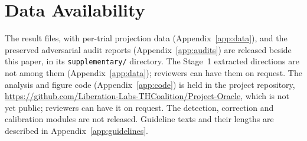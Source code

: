 \documentclass[11pt,letterpaper]{article}
\begin{document}
\section*{Data Availability}

The result files, with per-trial projection data (Appendix~\ref{app:data}), and the preserved
adversarial audit reports (Appendix~\ref{app:audits}) are released beside this paper, in its
\texttt{supplementary/} directory. The Stage~1 extracted directions are not among them
(Appendix~\ref{app:data}); reviewers can have them on request. The analysis and figure code (Appendix~\ref{app:code}) is held in the
project repository, \url{https://github.com/Liberation-Labs-THCoalition/Project-Oracle}, which is not
yet public; reviewers can have it on request. The detection, correction and calibration modules are not
released. Guideline texts and their lengths are described in Appendix~\ref{app:guidelines}.




\end{document}
